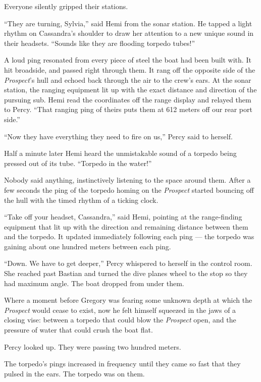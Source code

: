 \documentclass[
]{scrbook}
\begin{document}
Everyone silently gripped their stations.

``They are turning, Sylvia,'' said Hemi from the sonar station. He
tapped a light rhythm on Cassandra's shoulder to draw her attention to a
new unique sound in their headsets. ``Sounds like they are flooding
torpedo tubes!''

A loud ping resonated from every piece of steel the boat had been built
with. It hit broadside, and passed right through them. It rang off the
opposite side of the \emph{Prospect}'s hull and echoed back through the
air to the crew's ears. At the sonar station, the ranging equipment lit
up with the exact distance and direction of the pursuing sub. Hemi read
the coordinates off the range display and relayed them to Percy. ``That
ranging ping of theirs puts them at 612 meters off our rear port side.''

``Now they have everything they need to fire on us,'' Percy said to
herself.

Half a minute later Hemi heard the unmistakable sound of a torpedo being
pressed out of its tube. ``Torpedo in the water!''

Nobody said anything, instinctively listening to the space around them.
After a few seconds the ping of the torpedo homing on the
\emph{Prospect} started bouncing off the hull with the timed rhythm of a
ticking clock.

``Take off your headset, Cassandra,'' said Hemi, pointing at the
range-finding equipment that lit up with the direction and remaining
distance between them and the torpedo. It updated immediately following
each ping --- the torpedo was gaining about one hundred meters between
each ping.

``Down. We have to get deeper,'' Percy whispered to herself in the
control room. She reached past Bastian and turned the dive planes wheel
to the stop so they had maximum angle. The boat dropped from under them.

Where a moment before Gregory was fearing some unknown depth at which
the \emph{Prospect} would cease to exist, now he felt himself squeezed
in the jaws of a closing vise: between a torpedo that could blow the
\emph{Prospect} open, and the pressure of water that could crush the
boat flat.

Percy looked up. They were passing two hundred meters.

The torpedo's pings increased in frequency until they came so fast that
they pulsed in the ears. The torpedo was on them.
\end{document}
